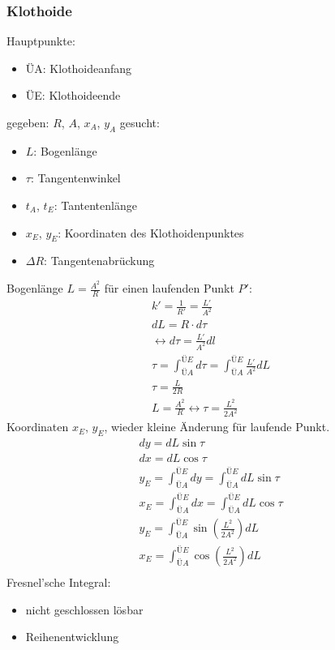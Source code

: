 \documentclass[12pt]{article}
\begin{document}
\subsubsection{Klothoide}
Hauptpunkte:
\begin{itemize}
\item ÜA: Klothoideanfang
\item ÜE: Klothoideende
\end{itemize}
gegeben: $R$, $A$, $x_A$, $y_A$ \newline
gesucht:
\begin{itemize}
\item $L$: Bogenlänge
\item $\tau$: Tangentenwinkel
\item $t_A$, $t_E$: Tantentenlänge
\item $x_E$, $y_E$: Koordinaten des Klothoidenpunktes
\item $\Delta R$: Tangentenabrückung
\end{itemize}
Bogenlänge $L = \frac{A^2}{R}$ \newline
\newline
für einen laufenden Punkt $P'$: 
\begin{gather*}
k' = \frac{1}{R'} = \frac{L'}{A^2}\\
dL = R \cdot d \tau \\
\longleftrightarrow d \tau = \frac{L'}{A^2} dl \\
\tau = \int_{ÜA}^{ÜE} d \tau = \int_{ÜA}^{ÜE} \frac{L'}{A^2} dL \\
\tau = \frac{L}{2R} \\
L = \frac{A^2}{R} \longleftrightarrow \tau = \frac{L^2}{2A^2}
\end{gather*}
Koordinaten $x_E$, $y_E$, wieder kleine Änderung für laufende Punkt.
\begin{gather*}
dy = dL \sin \tau \\
dx = dL \cos \tau \\
y_E = \int_{ÜA}^{ÜE} dy = \int_{ÜA}^{ÜE} dL \sin \tau \\
x_E = \int_{ÜA}^{ÜE} dx = \int_{ÜA}^{ÜE} dL \cos \tau \\
y_E = \int_{ÜA}^{ÜE} \sin (\frac{L^2}{2A^2}) dL \\
x_E = \int_{ÜA}^{ÜE} \cos (\frac{L^2}{2A^2}) dL \\
\end{gather*}
Fresnel'sche Integral:
\begin{itemize}
\item nicht geschlossen lösbar
\item Reihenentwicklung 
\end{itemize}
\end{document}
